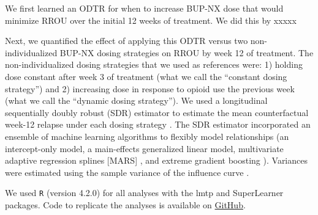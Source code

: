 \documentclass[11pt]{article}
\renewcommand{\d}{\mathsf{d}}
\newcommand{\E}{\mathsf{E}}
\begin{document}
We first learned an ODTR for when to increase BUP-NX dose that would minimize RROU over the initial 12 weeks of treatment. We did this by xxxxx


Next, we quantified the effect of applying this ODTR versus two non-individualized BUP-NX dosing strategies on RROU by week 12 of treatment. The non-individualized dosing strategies that we used as references were: 1) holding dose constant after week 3 of treatment (what we call the ``constant dosing strategy'') and 2) increasing dose in response to opioid use the previous week (what we call the ``dynamic dosing strategy''). We used a longitudinal sequentially doubly robust (SDR) estimator to estimate the mean counterfactual week-12 relapse under each dosing strategy \citep{luedtke2018sequential}. The SDR estimator incorporated an ensemble of machine learning algorithms \cite{van2007super} to flexibly model relationships (an intercept-only model, a main-effects generalized linear model, multivariate adaptive regression splines [MARS] \cite{friedman1991multivariate}, and extreme gradient boosting \cite{chenXGBoost}). Variances were estimated using the sample variance of the influence curve \cite{luedtke2018sequential}. 

We used \texttt{R} (version 4.2.0) for all analyses \cite{R} with the lmtp \cite{lmtpR, lmtpJASA} and SuperLearner \citep{SuperLearnerPkg} packages. Code to replicate the analyses is available on \href{https://github.com/Rudolph-et-al-MSPH-Epidemiology/odtr}{GitHub}.

\end{document}

